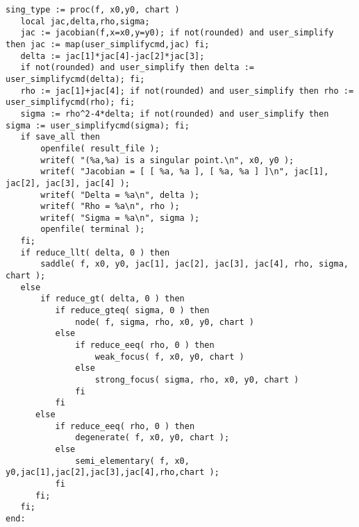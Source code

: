 \documentclass[a4paper,10pt]{article}
\begin{document}
\begin{lstlisting}[name=type]
sing_type := proc(f, x0,y0, chart )
   local jac,delta,rho,sigma;
   jac := jacobian(f,x=x0,y=y0); if not(rounded) and user_simplify then jac := map(user_simplifycmd,jac) fi;
   delta := jac[1]*jac[4]-jac[2]*jac[3];
   if not(rounded) and user_simplify then delta := user_simplifycmd(delta); fi;
   rho := jac[1]+jac[4]; if not(rounded) and user_simplify then rho := user_simplifycmd(rho); fi;
   sigma := rho^2-4*delta; if not(rounded) and user_simplify then sigma := user_simplifycmd(sigma); fi;
   if save_all then
       openfile( result_file );
       writef( "(%a,%a) is a singular point.\n", x0, y0 );
       writef( "Jacobian = [ [ %a, %a ], [ %a, %a ] ]\n", jac[1], jac[2], jac[3], jac[4] );
       writef( "Delta = %a\n", delta );
       writef( "Rho = %a\n", rho );
       writef( "Sigma = %a\n", sigma );
       openfile( terminal );
   fi;
   if reduce_llt( delta, 0 ) then
       saddle( f, x0, y0, jac[1], jac[2], jac[3], jac[4], rho, sigma, chart );
   else
       if reduce_gt( delta, 0 ) then
          if reduce_gteq( sigma, 0 ) then
              node( f, sigma, rho, x0, y0, chart )
          else
              if reduce_eeq( rho, 0 ) then
                  weak_focus( f, x0, y0, chart )
              else
                  strong_focus( sigma, rho, x0, y0, chart )
              fi
          fi
      else
          if reduce_eeq( rho, 0 ) then
              degenerate( f, x0, y0, chart );
          else
              semi_elementary( f, x0, y0,jac[1],jac[2],jac[3],jac[4],rho,chart );
          fi
      fi;
   fi;
end:
\end{lstlisting}
\end{document}

